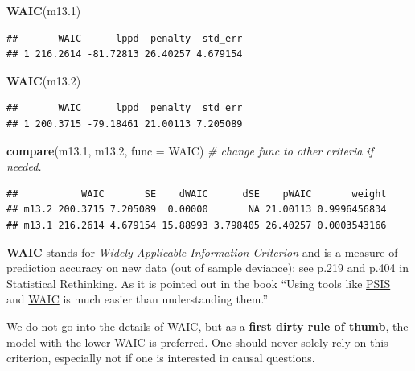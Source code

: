 \documentclass[
]{book}
\newenvironment{Shaded}{\begin{snugshade}}{\end{snugshade}}
\newcommand{\AttributeTok}[1]{\textcolor[rgb]{0.13,0.29,0.53}{#1}}
\newcommand{\CommentTok}[1]{\textcolor[rgb]{0.56,0.35,0.01}{\textit{#1}}}
\newcommand{\FloatTok}[1]{\textcolor[rgb]{0.00,0.00,0.81}{#1}}
\newcommand{\FunctionTok}[1]{\textcolor[rgb]{0.13,0.29,0.53}{\textbf{#1}}}
\newcommand{\NormalTok}[1]{#1}
\begin{document}
\begin{Shaded}
\begin{Highlighting}[]
\FunctionTok{WAIC}\NormalTok{(m13}\FloatTok{.1}\NormalTok{)}
\end{Highlighting}
\end{Shaded}

\begin{verbatim}
##       WAIC      lppd  penalty  std_err
## 1 216.2614 -81.72813 26.40257 4.679154
\end{verbatim}

\begin{Shaded}
\begin{Highlighting}[]
\FunctionTok{WAIC}\NormalTok{(m13}\FloatTok{.2}\NormalTok{)}
\end{Highlighting}
\end{Shaded}

\begin{verbatim}
##       WAIC      lppd  penalty  std_err
## 1 200.3715 -79.18461 21.00113 7.205089
\end{verbatim}

\begin{Shaded}
\begin{Highlighting}[]
\FunctionTok{compare}\NormalTok{(m13}\FloatTok{.1}\NormalTok{, m13}\FloatTok{.2}\NormalTok{, }\AttributeTok{func =}\NormalTok{ WAIC) }\CommentTok{\# change func to other criteria if needed.}
\end{Highlighting}
\end{Shaded}

\begin{verbatim}
##           WAIC       SE    dWAIC      dSE    pWAIC       weight
## m13.2 200.3715 7.205089  0.00000       NA 21.00113 0.9996456834
## m13.1 216.2614 4.679154 15.88993 3.798405 26.40257 0.0003543166
\end{verbatim}

\textbf{WAIC} stands for \emph{Widely Applicable Information Criterion} and is a
measure of prediction accuracy on new data (out of sample deviance); see
p.219 and p.404 in Statistical Rethinking. As it is pointed out in the book ``Using tools like
\href{https://sites.stat.columbia.edu/gelman/research/unpublished/VehtariGelmanGabry_PSIS_2017.pdf}{PSIS}
and \href{https://en.wikipedia.org/wiki/Watanabe\%E2\%80\%93Akaike_information_criterion}{WAIC}
is much easier than understanding them.''

We do not go into the details of WAIC, but as a \textbf{first dirty rule of thumb},
the model with the lower WAIC is preferred. One should never solely rely on
this criterion, especially not if one is interested in causal questions.
\end{document}
